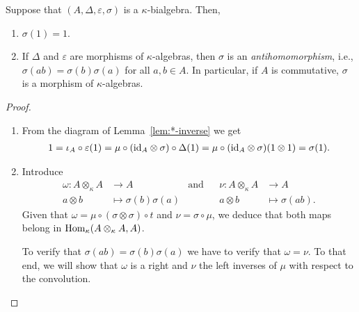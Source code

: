 \begin{lem}\label{lem:*-coinverse-ok}
    Suppose that\/ $(A, \Delta, \varepsilon, \sigma)$ is a\/ $\kappa$-bialgebra. Then,
    \begin{enumerate}[\rm a)]
        \item $\sigma(1)=1$.
        \item If\/ $\Delta$ and\/ $\varepsilon$ are morphisms of\/ $\kappa$-algebras, then\/ $\sigma$ is an \textsl{antihomomorphism}, i.e., $\sigma(ab)=\sigma(b)\sigma(a)$ for all\/ $a,b\in A$. In particular, if\/ $A$ is commutative, $\sigma$ is a morphism of\/ $\kappa$-algebras.
    \end{enumerate}
\end{lem}

\begin{proof}${}$
    \begin{enumerate}[\rm a)]
        \item From the diagram of Lemma~\ref{lem:*-inverse} we get
        \begin{align*}
            1 = \iota_A\circ\varepsilon(1)
                = \mu\circ(\text{\rm id}_A\otimes\sigma)\circ\Delta(1)
                = \mu\circ(\text{\rm id}_A\otimes\sigma)(1\otimes 1)
                = \sigma(1).
        \end{align*}
        \item Introduce
        \begin{align*}
            \omega\colon A\otimes_\kappa A&\to A
            &\text{and}&&\nu\colon A\otimes_\kappa A&\to A\\
            a\otimes b&\mapsto \sigma(b)\sigma(a)
            &&&a\otimes b&\mapsto\sigma(ab).
        \end{align*}
        Given that $\omega=\mu\circ(\sigma\otimes\sigma)\circ t$ and $\nu=\sigma\circ\mu$, we deduce that both maps belong in ${\rm Hom}_\kappa(A\otimes_\kappa A,A)$.

        To verify that $\sigma(ab)=\sigma(b)\sigma(a)$ we have to verify that $\omega=\nu$. To that end, we will show that $\omega$ is a right and $\nu$ the left inverses of $\mu$ with respect to the convolution.


\end{enumerate}
\end{proof}
